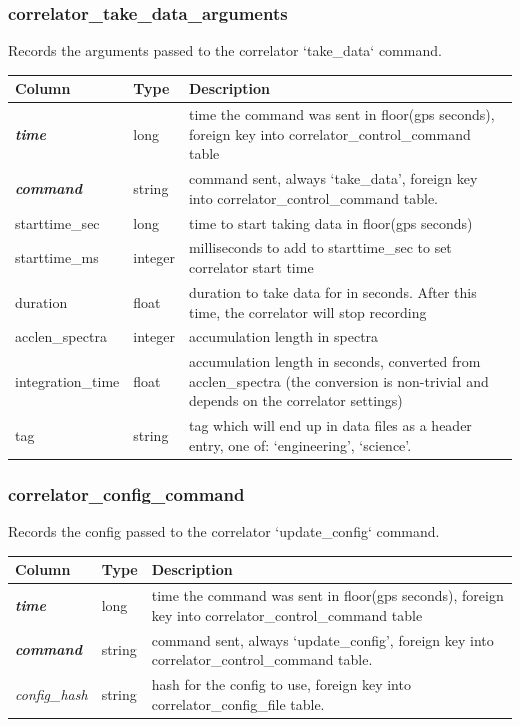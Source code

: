 \documentclass{article}
\begin{document}
{\subsubsection{correlator\_take\_data\_arguments}
Records the arguments passed to the correlator `take\_data` command.
\begin{center}
 \begin{tabular}{| p{4cm} | p{2cm} | p{10cm} |}
\hline
 {\bf Column} & {\bf Type}  & {\bf Description} \\ [0.5ex]  \hline\hline
\textbf{\textit{time}} & long & time the command was sent in floor(gps seconds), foreign key into correlator\_control\_command table\\ \hline
\textbf{\textit{command}} & string & command sent, always `take\_data', foreign key into correlator\_control\_command table.  \\ \hline
starttime\_sec & long & time to start taking data in floor(gps seconds) \\\hline
starttime\_ms & integer & milliseconds to add to starttime\_sec to set correlator start time\\\hline
duration & float & duration to take data for in seconds. After this time, the correlator will stop recording\\\hline
acclen\_spectra & integer & accumulation length in spectra\\\hline
integration\_time & float & accumulation length in seconds, converted from acclen\_spectra (the conversion is non-trivial and depends on the correlator settings)\\\hline
tag & string & tag which will end up in data files as a header entry, one of: `engineering', `science'.\\\hline
\end{tabular}
\end{center}

\subsubsection{correlator\_config\_command}
Records the config passed to the correlator `update\_config` command.
\begin{center}
 \begin{tabular}{| p{4cm} | p{2cm} | p{10cm} |}
\hline
 {\bf Column} & {\bf Type}  & {\bf Description} \\ [0.5ex]  \hline\hline
\textbf{\textit{time}} & long & time the command was sent in floor(gps seconds), foreign key into correlator\_control\_command table\\ \hline
\textbf{\textit{command}} & string & command sent, always `update\_config', foreign key into correlator\_control\_command table.  \\ \hline
\textit{config\_hash} & string & hash for the config to use, foreign key into correlator\_config\_file table.\\ \hline
\end{tabular}
\end{center}

}
\end{document}
